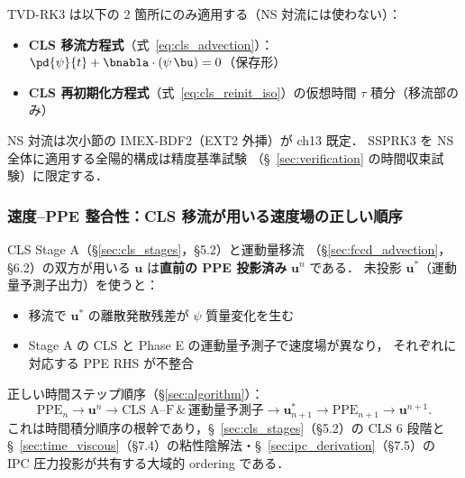 \begin{tcolorbox}[warnbox, title={TVD-RK3 の適用範囲}]
\label{warn:tvd_rk3_scope}
TVD-RK3 は以下の 2 箇所にのみ適用する（NS 対流には使わない）：
\begin{itemize}
  \item \textbf{CLS 移流方程式}（式~\eqref{eq:cls_advection}）：
        $\pd{\psi}{t} + \bnabla\cdot(\psi\,\bu) = 0$（保存形）
  \item \textbf{CLS 再初期化方程式}（式~\eqref{eq:cls_reinit_iso}）の仮想時間 $\tau$ 積分（移流部のみ）
\end{itemize}
NS 対流は次小節の IMEX-BDF2（EXT2 外挿）が ch13 既定．
SSPRK3 を NS 全体に適用する全陽的構成は精度基準試験
（§~\ref{sec:verification} の時間収束試験）に限定する．
\end{tcolorbox}

\subsubsection{速度--PPE 整合性：CLS 移流が用いる速度場の正しい順序}
\label{sec:cls_velocity_consistency_v7}
\label{sec:cls_velocity_consistency}%

CLS Stage A（\S\ref{sec:cls_stages}，§5.2）と運動量移流
（\S\ref{sec:fccd_advection}，§6.2）の双方が用いる
$\mathbf{u}$ は\textbf{直前の PPE 投影済み} $\mathbf{u}^n$ である．
未投影 $\mathbf{u}^*$（運動量予測子出力）を使うと：
\begin{itemize}
  \item 移流で $\mathbf{u}^*$ の離散発散残差が $\psi$ 質量変化を生む
  \item Stage A の CLS と Phase E の運動量予測子で速度場が異なり，
        それぞれに対応する PPE RHS が不整合
\end{itemize}
正しい時間ステップ順序（\S\ref{sec:algorithm}）：
\begin{equation*}
  \text{PPE}_n\to\mathbf{u}^n\to\text{CLS A--F}\,\&\,\text{運動量予測子}
  \to\mathbf{u}^*_{n+1}\to\text{PPE}_{n+1}\to\mathbf{u}^{n+1}.
\end{equation*}
これは時間積分順序の根幹であり，\S~\ref{sec:cls_stages}（§5.2）の CLS 6 段階と
\S~\ref{sec:time_viscous}（§7.4）の粘性陰解法・\S~\ref{sec:ipc_derivation}（§7.5）の
IPC 圧力投影が共有する大域的 ordering である．

